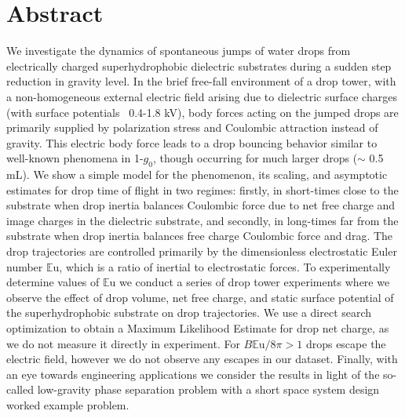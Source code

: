 \documentclass[12pt,a4paper,oneside]{book}
\begin{document}
\section*{Abstract}
\noindent
We investigate the dynamics of spontaneous jumps of water drops from electrically charged superhydrophobic dielectric substrates during a sudden step reduction in gravity level. In the brief free-fall environment of a drop tower, with a non-homogeneous external electric field arising due to dielectric surface charges (with surface potentials ~0.4-1.8 kV), body forces acting on the jumped drops are primarily supplied by polarization stress and Coulombic attraction instead of gravity. This electric body force leads to a drop bouncing behavior similar to well-known phenomena in 1-$g_0$, though occurring for much larger drops ($\sim$ 0.5 mL). We show a simple model for the phenomenon, its scaling, and asymptotic estimates for drop time of flight in two regimes: firstly, in short-times close to the substrate when drop inertia balances Coulombic force due to net free charge and image charges in the dielectric substrate, and secondly, in long-times far from the substrate when drop inertia balances free charge Coulombic force and drag. The drop trajectories are controlled primarily by the dimensionless electrostatic Euler number $\mathbb{E}\mbox{u}$, which is a ratio of inertial to electrostatic forces. To experimentally determine values of $\mathbb{E}\mbox{u}$ we conduct a series of drop tower experiments where we observe the effect of drop volume, net free charge, and static surface potential of the superhydrophobic substrate on drop trajectories. We use a direct search optimization to obtain a Maximum Likelihood Estimate for drop net charge, as we do not measure it directly in experiment. For $B \mathbb{E}\mbox{u} /8 \pi > 1$ drops escape the electric field, however we do not observe any escapes in our dataset. Finally, with an eye towards engineering applications we consider the results in light of the so-called low-gravity phase separation problem with a short space system design worked example problem.

\clearpage

\vspace*{\fill}
\end{document}
